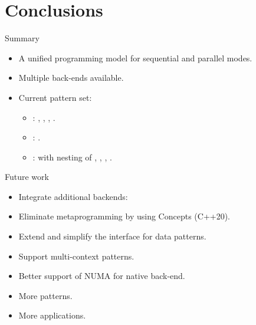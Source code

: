 \section{Conclusions}

\begin{frame}[t]{Summary}
\begin{itemize}
  \item A unified programming model for sequential and parallel modes.
  \item Multiple back-ends available.
  \item Current pattern set:
    \begin{itemize}
      \item {}: , , , .
      \item {}: .
      \item {}:  with nesting of , ,
            , .
    \end{itemize}
\end{itemize}
\end{frame}

\begin{frame}[t]{Future work}
\begin{itemize}
  \item Integrate additional backends:
  \item Eliminate metaprogramming by using Concepts (C++20).
  \item Extend and simplify the interface for data patterns.
  \item Support multi-context patterns.
  \item Better support of NUMA for native back-end. 
  \item More patterns.
  \item More applications.
\end{itemize}
\end{frame}

